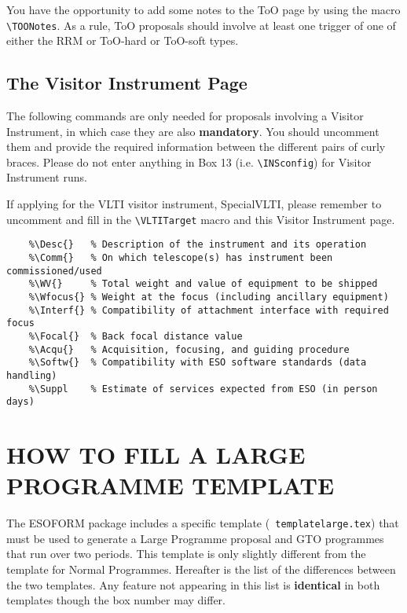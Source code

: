 \documentclass{article}
\begin{document}
You have the opportunity to add some notes to the ToO page by using
the macro \verb|\TOONotes|.
As a rule, ToO proposals should involve at least one trigger
of one of either the RRM or ToO-hard or ToO-soft types.



\subsection{The Visitor Instrument Page}
\label{sec:visins}

The following commands are only needed for proposals involving a Visitor
Instrument, in which case they are also {\bf mandatory}.  You should
uncomment them and provide the required information between the
different pairs of curly braces. Please do not enter anything in Box 13 
(i.e. \verb|\INSconfig|) for Visitor Instrument runs.

If applying for the VLTI visitor instrument, SpecialVLTI, please remember to uncomment
and fill in the \verb|\VLTITarget| macro and this Visitor Instrument page.

\begin{verbatim}
    %\Desc{}   % Description of the instrument and its operation
    %\Comm{}   % On which telescope(s) has instrument been commissioned/used
    %\WV{}     % Total weight and value of equipment to be shipped
    %\Wfocus{} % Weight at the focus (including ancillary equipment)
    %\Interf{} % Compatibility of attachment interface with required focus
    %\Focal{}  % Back focal distance value
    %\Acqu{}   % Acquisition, focusing, and guiding procedure
    %\Softw{}  % Compatibility with ESO software standards (data handling)
    %\Suppl    % Estimate of services expected from ESO (in person days)
\end{verbatim}


\section{HOW TO FILL A LARGE PROGRAMME TEMPLATE}
\label{sec:large}

The ESOFORM package includes a specific template ({\tt
  templatelarge.tex}) that must be used to generate a Large Programme
proposal and GTO programmes that run over two periods. This template is only slightly different from the
template for Normal Programmes. Hereafter is the list of the
differences between the two templates. Any feature not appearing in
this list is {\bf identical} in both templates though the box number
may differ.
\end{document}
